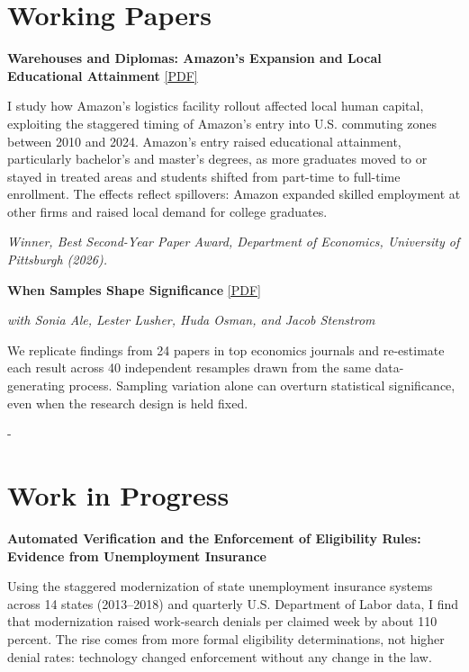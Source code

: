 \documentclass[11pt]{article}
\makeatletter
\newcommand{\needspace}[1]{\par\penalty-100\begingroup
  \setlength{\dimen@}{#1}\dimen@ii\pagegoal\advance\dimen@ii-\pagetotal
  \ifdim\dimen@>\dimen@ii\ifdim\dimen@ii>\z@\vfil\fi\break\fi\endgroup}
\makeatother
\begin{document}
\section*{Working Papers}
\textbf{Warehouses and Diplomas: Amazon's Expansion and Local Educational Attainment}
\hfill \href{https://shafique-Islam-pitt.github.io/manuscript.pdf}{[PDF]}\par
I study how Amazon's logistics facility rollout affected local human capital, exploiting the
staggered timing of Amazon's entry into U.S. commuting zones between 2010 and 2024. Amazon's
entry raised educational attainment, particularly bachelor's and master's degrees, as more
graduates moved to or stayed in treated areas and students shifted from part-time to full-time
enrollment. The effects reflect spillovers: Amazon expanded skilled employment at other firms and
raised local demand for college graduates.\par
\textit{Winner, Best Second-Year Paper Award, Department of Economics, University of Pittsburgh (2026).}
\vspace{0.5em}

\textbf{When Samples Shape Significance}
\hfill \href{https://shafique-Islam-pitt.github.io/When_Samples_Shape_Significance.pdf}{[PDF]}\par
\textit{with Sonia Ale, Lester Lusher, Huda Osman, and Jacob Stenstrom}\par
We replicate findings from 24 papers in top economics journals and re-estimate each result across
40 independent resamples drawn from the same data-generating process. Sampling variation alone can
overturn statistical significance, even when the research design is held fixed.
\vspace{0.5em}

\needspace{10\baselineskip}
\section*{Work in Progress}
\textbf{Automated Verification and the Enforcement of Eligibility Rules:\\ Evidence from Unemployment Insurance}\par
Using the staggered modernization of state unemployment insurance systems across 14 states
(2013--2018) and quarterly U.S. Department of Labor data, I find that modernization raised
work-search denials per claimed week by about 110 percent. The rise comes from more formal
eligibility determinations, not higher denial rates: technology changed enforcement without any
change in the law.
\vspace{0.5em}
\end{document}
